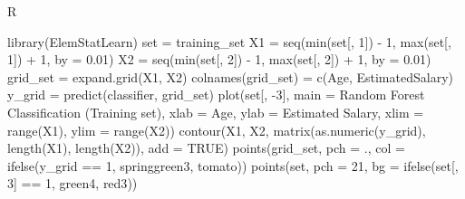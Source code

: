 \documentclass[
]{book}
\newenvironment{Shaded}{\begin{snugshade}}{\end{snugshade}}
\newcommand{\AttributeTok}[1]{\textcolor[rgb]{0.77,0.63,0.00}{#1}}
\newcommand{\ConstantTok}[1]{\textcolor[rgb]{0.00,0.00,0.00}{#1}}
\newcommand{\DecValTok}[1]{\textcolor[rgb]{0.00,0.00,0.81}{#1}}
\newcommand{\FloatTok}[1]{\textcolor[rgb]{0.00,0.00,0.81}{#1}}
\newcommand{\FunctionTok}[1]{\textcolor[rgb]{0.00,0.00,0.00}{#1}}
\newcommand{\NormalTok}[1]{#1}
\newcommand{\OtherTok}[1]{\textcolor[rgb]{0.56,0.35,0.01}{#1}}
\newcommand{\SpecialCharTok}[1]{\textcolor[rgb]{0.00,0.00,0.00}{#1}}
\newcommand{\StringTok}[1]{\textcolor[rgb]{0.31,0.60,0.02}{#1}}
\theoremstyle{definition}
\theoremstyle{definition}
\theoremstyle{definition}
\theoremstyle{definition}
\theoremstyle{remark}
\begin{document}
R

\begin{Shaded}
\begin{Highlighting}[]
\FunctionTok{library}\NormalTok{(ElemStatLearn)}
\NormalTok{set }\OtherTok{=}\NormalTok{ training\_set}
\NormalTok{X1 }\OtherTok{=} \FunctionTok{seq}\NormalTok{(}\FunctionTok{min}\NormalTok{(set[, }\DecValTok{1}\NormalTok{]) }\SpecialCharTok{{-}} \DecValTok{1}\NormalTok{, }\FunctionTok{max}\NormalTok{(set[, }\DecValTok{1}\NormalTok{]) }\SpecialCharTok{+} \DecValTok{1}\NormalTok{, }\AttributeTok{by =} \FloatTok{0.01}\NormalTok{)}
\NormalTok{X2 }\OtherTok{=} \FunctionTok{seq}\NormalTok{(}\FunctionTok{min}\NormalTok{(set[, }\DecValTok{2}\NormalTok{]) }\SpecialCharTok{{-}} \DecValTok{1}\NormalTok{, }\FunctionTok{max}\NormalTok{(set[, }\DecValTok{2}\NormalTok{]) }\SpecialCharTok{+} \DecValTok{1}\NormalTok{, }\AttributeTok{by =} \FloatTok{0.01}\NormalTok{)}
\NormalTok{grid\_set }\OtherTok{=} \FunctionTok{expand.grid}\NormalTok{(X1, X2)}
\FunctionTok{colnames}\NormalTok{(grid\_set) }\OtherTok{=} \FunctionTok{c}\NormalTok{(}\StringTok{\textquotesingle{}Age\textquotesingle{}}\NormalTok{, }\StringTok{\textquotesingle{}EstimatedSalary\textquotesingle{}}\NormalTok{)}
\NormalTok{y\_grid }\OtherTok{=} \FunctionTok{predict}\NormalTok{(classifier, grid\_set)}
\FunctionTok{plot}\NormalTok{(set[, }\SpecialCharTok{{-}}\DecValTok{3}\NormalTok{],}
     \AttributeTok{main =} \StringTok{\textquotesingle{}Random Forest Classification (Training set)\textquotesingle{}}\NormalTok{,}
     \AttributeTok{xlab =} \StringTok{\textquotesingle{}Age\textquotesingle{}}\NormalTok{, }\AttributeTok{ylab =} \StringTok{\textquotesingle{}Estimated Salary\textquotesingle{}}\NormalTok{,}
     \AttributeTok{xlim =} \FunctionTok{range}\NormalTok{(X1), }\AttributeTok{ylim =} \FunctionTok{range}\NormalTok{(X2))}
\FunctionTok{contour}\NormalTok{(X1, X2, }\FunctionTok{matrix}\NormalTok{(}\FunctionTok{as.numeric}\NormalTok{(y\_grid), }\FunctionTok{length}\NormalTok{(X1), }\FunctionTok{length}\NormalTok{(X2)), }\AttributeTok{add =} \ConstantTok{TRUE}\NormalTok{)}
\FunctionTok{points}\NormalTok{(grid\_set, }\AttributeTok{pch =} \StringTok{\textquotesingle{}.\textquotesingle{}}\NormalTok{, }\AttributeTok{col =} \FunctionTok{ifelse}\NormalTok{(y\_grid }\SpecialCharTok{==} \DecValTok{1}\NormalTok{, }\StringTok{\textquotesingle{}springgreen3\textquotesingle{}}\NormalTok{, }\StringTok{\textquotesingle{}tomato\textquotesingle{}}\NormalTok{))}
\FunctionTok{points}\NormalTok{(set, }\AttributeTok{pch =} \DecValTok{21}\NormalTok{, }\AttributeTok{bg =} \FunctionTok{ifelse}\NormalTok{(set[, }\DecValTok{3}\NormalTok{] }\SpecialCharTok{==} \DecValTok{1}\NormalTok{, }\StringTok{\textquotesingle{}green4\textquotesingle{}}\NormalTok{, }\StringTok{\textquotesingle{}red3\textquotesingle{}}\NormalTok{))}
\end{Highlighting}
\end{Shaded}
\end{document}
